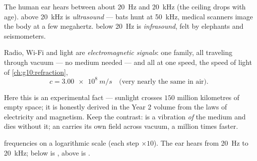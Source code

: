 \begin{definition}\label{def:g10:signals-and-waves:ultrasound}
The human ear hears  between about \qty{20}{Hz} and \qty{20}{kHz}
(the ceiling drops with age).  above \qty{20}{kHz} is
\emph{ultrasound} --- bats hunt at \qty{50}{kHz},
medical scanners image the body at a few megahertz.  below
\qty{20}{Hz} is \emph{infrasound}, felt by elephants
and seismometers.
\end{definition}

\begin{proposition}\label{prop:g10:signals-and-waves:em}
Radio, Wi-Fi and light are \emph{electromagnetic
signals}: one family, all traveling
through vacuum --- no medium needed --- and all at one speed, the speed
of light of \cref{ch:g10:refraction},
\[
c = \qty{3.00e8}{m/s} \quad \text{(very nearly the same in air).}
\]
\end{proposition}
\admitted

\begin{remark}\label{rem:g10:signals-and-waves:honest}
Here this is an experimental fact --- sunlight crosses $150$ million
kilometres of empty space; it is honestly derived in the Year 2 volume
from the laws of electricity and magnetism. Keep the contrast:  is
a vibration \emph{of} the medium and dies without it; an  carries its own field across vacuum, a million times faster.
\end{remark}

\begin{omfigure}

{\small {} frequencies on a logarithmic scale (each step $\times 10$).
The ear hears from \qty{20}{Hz} to \qty{20}{kHz}; below is ,
above is .}
\end{omfigure}


